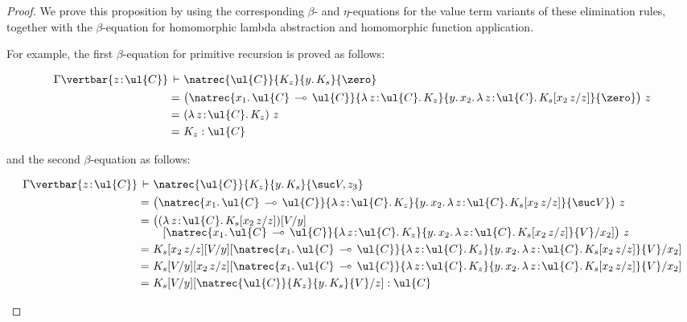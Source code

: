 \begin{proof}
We prove this proposition by using the corresponding $\beta$- and $\eta$-equations for the value term variants of these elimination rules, together with the $\beta$-equation for homomorphic lambda abstraction and homomorphic function application. 

For example, the first $\beta$-equation for primitive recursion is proved as follows:
\begin{fleqn}[0.3cm]
\begin{align*}
\Gamma \vertbar {z \!:\! \ul{C}} \,\vdash\,\, & \natrec {\ul{C}} {K_z} {y .\, K_s} {\zero}
\\
=\,\, & \big(\natrec {x_1.\,\ul{C} \,\multimap\, \ul{C}} {\lambda\, z \!:\! \ul{C} .\, K_z} {y.\, x_2.\, \lambda\, z \!:\! \ul{C} .\, K_s[x_2\, z/z]} {\zero}\big)\,\, z
\\
=\,\, & (\lambda\, z \!:\! \ul{C} .\, K_z)\,\, z
\\
=\,\, & K_z : \ul{C}
\end{align*}
\end{fleqn}
and the second $\beta$-equation as follows:
\begin{fleqn}[0.3cm]
\begin{align*}
\Gamma \vertbar {z \!:\! \ul{C}} \,\vdash\,\, & \natrec {\ul{C}} {K_z} {y .\, K_s} {\suc V , z_3}
\\
=\,\, & \big(\natrec {x_1.\,\ul{C} \,\multimap\, \ul{C}} {\lambda\, z \!:\! \ul{C} .\, K_z} {y.\, x_2.\, \lambda\, z \!:\! \ul{C} .\, K_s[x_2\, z/z]} {\suc V}\big)\,\, z
\\
=\,\, & \big((\lambda\, z \!:\! \ul{C} .\, K_s[x_2\, z/z])[V/y]
\\[-2mm]
& \hspace{0.3cm} [\natrec {x_1.\,\ul{C} \,\multimap\, \ul{C}} {\lambda\, z \!:\! \ul{C} .\, K_z} {y.\, x_2.\, \lambda\, z \!:\! \ul{C} .\, K_s[x_2\, z/z]} {V}/x_2]\big)\,\, z
\\
=\,\, & K_s[x_2\, z/z][V/y][\natrec {x_1.\,\ul{C} \,\multimap\, \ul{C}} {\lambda\, z \!:\! \ul{C} .\, K_z} {y.\, x_2.\, \lambda\, z \!:\! \ul{C} .\, K_s[x_2\, z/z]} {V}/x_2]
\\
=\,\, & K_s[V/y][x_2\, z/z][\natrec {x_1.\,\ul{C} \,\multimap\, \ul{C}} {\lambda\, z \!:\! \ul{C} .\, K_z} {y.\, x_2.\, \lambda\, z \!:\! \ul{C} .\, K_s[x_2\, z/z]} {V}/x_2]
\\
=\,\, & K_s[V/y][\natrec {\ul{C}} {K_z} {y .\, K_s} {V}/z] : \ul{C}
\end{align*}
\end{fleqn}


\end{proof}
